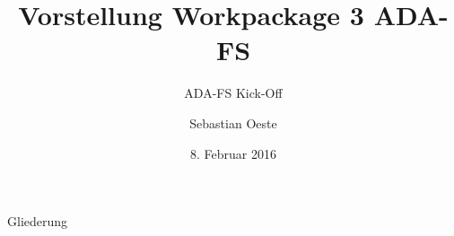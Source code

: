 \documentclass[10pt]{beamer}
\date{8. Februar 2016}
\institute[ZIH TUD]{Zentrum f\"{u}r Informationsdienste und Hochleistungsrechnen -- TU Dresden}
\title[LCTP]{Vorstellung Workpackage 3 ADA-FS}
\subtitle{ADA-FS Kick-Off}
\author[Oeste]{Sebastian Oeste}
\begin{document}
\zihmaketitle
\begin{frame}{Gliederung}
    \tableofcontents
\end{frame}




\end{document}
